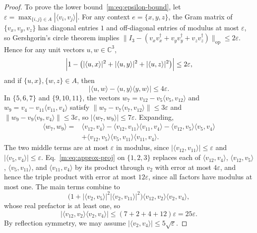 \documentclass[aps,pra,reprint,superscriptaddress,longbibliography,nofootinbib,floatfix,10pt]{revtex4-2}
\theoremstyle{definition}
\newcommand{\C}{\mathbb{C}}
\begin{document}
\begin{proof}
To prove the lower bound~\eqref{m:eq:epsilon-bound}, let
$\varepsilon=\max_{\{i,j\}\in A}|\langle v_i,v_j\rangle|$. For any context
$e=\{x,y,z\}$, the Gram matrix of $\{v_x,v_y,v_z\}$ has diagonal entries $1$ and
off-diagonal entries of modulus at most $\varepsilon$, so Gershgorin's circle
theorem implies $\|I_3-(v_x v_x^\dagger+v_y v_y^\dagger+v_z v_z^\dagger)\|_{\mathrm{op}}\le 2\varepsilon$.
Hence for any unit vectors $u,w\in\C^3$,
\begin{equation}\label{m:eq:approx-parseval}
\Bigl|1-\bigl(|\langle u,x\rangle|^2+|\langle u,y\rangle|^2+|\langle u,z\rangle|^2\bigr)\Bigr|\le 2\varepsilon,
\end{equation}
and if $\{u,x\},\{w,z\}\in A$, then
\begin{equation}\label{m:eq:approx-proj}
\bigl|\langle u,w\rangle - \langle u,y\rangle\langle y,w\rangle\bigr| \le 4\varepsilon.
\end{equation}
In $\{5,6,7\}$ and $\{9,10,11\}$, the vectors
$w_7 = v_{12}-v_5\langle v_5,v_{12}\rangle$ and
$w_9 = v_4-v_{11}\langle v_{11},v_4\rangle$ satisfy
$\|w_7-v_7\langle v_7,v_{12}\rangle\|\le 3\varepsilon$ and
$\|w_9-v_9\langle v_9,v_4\rangle\|\le 3\varepsilon$, so
$|\langle w_7,w_9\rangle|\le 7\varepsilon$. Expanding,
\[
\begin{aligned}
\langle w_7,w_9\rangle={}&\langle v_{12},v_4\rangle
-\langle v_{12},v_{11}\rangle\langle v_{11},v_4\rangle
-\langle v_{12},v_5\rangle\langle v_5,v_4\rangle\\
&+\langle v_{12},v_5\rangle\langle v_5,v_{11}\rangle\langle v_{11},v_4\rangle .
\end{aligned}
\]
The two middle terms are at most $\varepsilon$ in modulus, since
$|\langle v_{12},v_{11}\rangle|\le\varepsilon$ and
$|\langle v_5,v_4\rangle|\le\varepsilon$. Eq.~\eqref{m:eq:approx-proj} on
$\{1,2,3\}$ replaces each of $\langle v_{12},v_4\rangle$,
$\langle v_{12},v_5\rangle$, $\langle v_5,v_{11}\rangle$, and
$\langle v_{11},v_4\rangle$ by its product through $v_2$ with error at most
$4\varepsilon$, and hence the triple product with error at most $12\varepsilon$,
since all factors have modulus at most one. The main terms combine to
\[
\bigl(1+|\langle v_2,v_5\rangle|^2|\langle v_2,v_{11}\rangle|^2\bigr)
\langle v_{12},v_2\rangle\langle v_2,v_4\rangle ,
\]
whose real prefactor is at least one, so
\[
\bigl|\langle v_{12},v_2\rangle\langle v_2,v_4\rangle\bigr|
\le (7+2+4+12)\varepsilon = 25\varepsilon.
\]
By reflection symmetry, we may assume $|\langle v_2,v_4\rangle|\le 5\sqrt{\varepsilon}$.

\end{proof}
\end{document}
